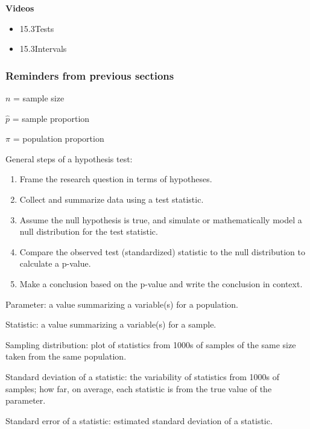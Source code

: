 \documentclass[
]{report}
\providecommand{\tightlist}{%
  \setlength{\itemsep}{0pt}\setlength{\parskip}{0pt}}
\begin{document}

\textbf{Videos}

\begin{itemize}
\tightlist
\item
  15.3Tests
\item
  15.3Intervals
\end{itemize}


\hypertarget{reminders-from-previous-sections-8}{%
\subsubsection*{Reminders from previous sections}\label{reminders-from-previous-sections-8}}

\(n\) = sample size

\(\hat{p}\) = sample proportion

\(\pi\) = population proportion

General steps of a hypothesis test:

\begin{enumerate}
\def\labelenumi{\arabic{enumi}.}
\item
  Frame the research question in terms of hypotheses.
\item
  Collect and summarize data using a test statistic.
\item
  Assume the null hypothesis is true, and simulate or mathematically model a null distribution for the test statistic.
\item
  Compare the observed test (standardized) statistic to the null distribution to calculate a p-value.
\item
  Make a conclusion based on the p-value and write the conclusion in context.
\end{enumerate}

Parameter: a value summarizing a variable(s) for a population.

Statistic: a value summarizing a variable(s) for a sample.

Sampling distribution: plot of statistics from 1000s of samples of the same size taken from the same population.

Standard deviation of a statistic: the variability of statistics from 1000s of samples; how far, on average, each statistic is from the true value of the parameter.

Standard error of a statistic: estimated standard deviation of a statistic.
\end{document}
